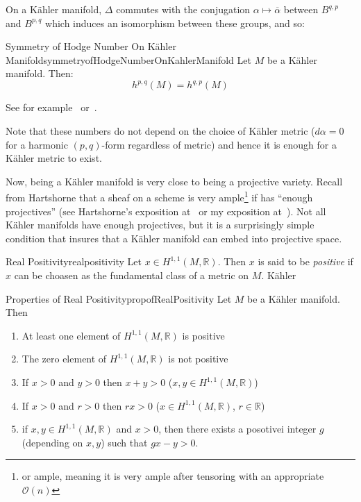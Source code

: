\documentclass{book}
\newcommand{\R}{{\mathbb{R}}}
\newcommand{\CO}{{\mathcal{O}}}
\begin{document}
On a K\"ahler manifold, $\Delta$ commutes with the conjugation $\alpha \mapsto \overline{\alpha}$ between
$B^{q,p}$ and $B^{p,q}$ which induces an isomorphism between these groups, and so:
\begin{thm}{Symmetry of Hodge Number On K\"ahler Manifold}{symmetryofHodgeNumberOnKahlerManifold}
  Let $M$ be a K\"ahler manifold. Then:
  \[
  h^{p,q}(M) = h^{q,p}(M)
\]
\end{thm}

\begin{Proof}
  See for example~\cite{HodgeTheory2014} or~\cite{voisinHodgeTheoryComplex2002}.
\end{Proof}

Note that these numbers do not depend on the choice of K\"ahler metric ($d\alpha = 0$ for a harmonic
$(p,q)$-form regardless of metric) and hence it is enough for a K\"ahler metric to exist.

Now, being a K\"ahler manifold is very close to being a projective variety. Recall from Hartshorne that
a sheaf on a scheme is very ample\footnote{or ample, meaning it is very ample after tensoring with an
appropriate $\CO(n)$} if has ``enough projectives'' (see Hartshorne's
exposition at~\cite{hartshorneAlgebraicGeometry2013} or my exposition at~\cite{NateAlgGeo}). Not all K\"ahler
manifolds have enough projectives, but it is a surprisingly simple condition that insures that a K\"ahler
manifold can embed into projective space.

\begin{defn}{Real Positivity}{realpositivity}
  Let $x \in H^{1,1}(M, \R)$. Then $x$ is said to be \emph{positive} if $x$ can be choasen as the fundamental
  class of a  metric on $M$. K\"ahler
\end{defn}

\begin{prop}{Properties of Real Positivity}{propofRealPositivity}
  Let $M$ be a K\"ahler manifold. Then
  \begin{enumerate}
    \item At least one element of  $H^{1,1}(M,\R)$ is positive
    \item The zero element of $H^{1,1}(M,\R)$ is not positive
    \item If $x >0$ and $y > 0$ then $x+y> 0$ ($x,y \in H^{1,1}(M, \R)$)
    \item If $x >0$ and $r > 0$ then $rx> 0$ ($x \in H^{1,1}(M, \R)$, $r \in \R$)
    \item if $x,y \in H^{1,1}(M, \R)$ and $x > 0$, then there exists a posotivei integer $g$ (depending on
      $x,y$) such that $gx-y > 0$.
  \end{enumerate}
\end{prop}
\end{document}
